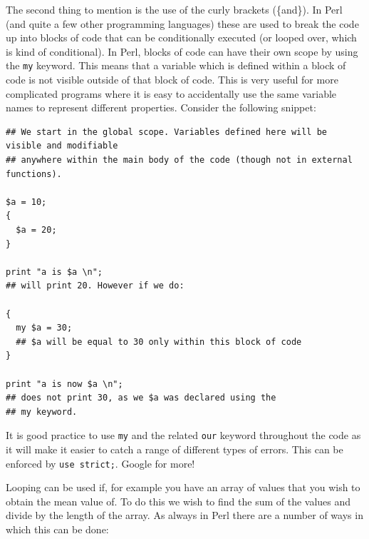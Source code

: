 \documentclass[11pt]{article}
\begin{document}
The second thing to mention is the use of the curly brackets (\{and\}). In
Perl (and quite a few other programming languages) these are used to
break the code up into blocks of code that can be conditionally executed
(or looped over, which is kind of conditional). In Perl, blocks of code
can have their own scope by using the \texttt{my} keyword. This means that a
variable which is defined within a block of code is not visible outside
of that block of code. This is very useful for more complicated programs
where it is easy to accidentally use the same variable names to represent
different properties.
Consider the following snippet:


\begin{verbatim}
## We start in the global scope. Variables defined here will be visible and modifiable
## anywhere within the main body of the code (though not in external functions).

$a = 10;
{
  $a = 20;
}

print "a is $a \n";
## will print 20. However if we do:

{
  my $a = 30;
  ## $a will be equal to 30 only within this block of code
}

print "a is now $a \n";
## does not print 30, as we $a was declared using the
## my keyword.
\end{verbatim}

It is good practice to use \texttt{my} and the related \texttt{our} keyword throughout
the code as it will make it easier to catch a range of different types
of errors. This can be enforced by \texttt{use strict;}. Google for more!

Looping can be used if, for example you have an array of values that you wish to
obtain the mean value of. To do this we wish to find the sum of the
values and divide by the length of the array. As always in Perl there
are a number of ways in which this can be done:
\end{document}
